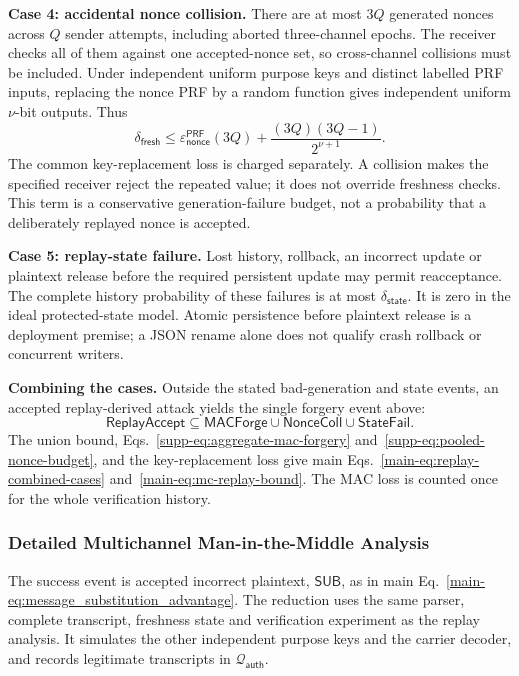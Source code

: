 \documentclass[journal]{IEEEtran}
\theoremstyle{definition}
\theoremstyle{game}
\begin{document}
\textbf{Case 4: accidental nonce collision.}
There are at most $3Q$ generated nonces across $Q$ sender attempts,
including aborted three-channel epochs.
The receiver checks all of them against one accepted-nonce set, so
cross-channel collisions must be included. Under independent uniform
purpose keys and distinct labelled PRF inputs, replacing the nonce PRF by
a random function gives independent uniform $\nu$-bit outputs. Thus
\begin{equation}\label{supp-eq:pooled-nonce-budget}
\delta_{\mathsf{fresh}}
\le\varepsilon_{\mathsf{nonce}}^{\mathsf{PRF}}(3Q)
+\frac{(3Q)(3Q-1)}{2^{\nu+1}}.
\end{equation}
The common key-replacement loss is charged separately. A collision makes
the specified receiver reject the repeated value; it does not override
freshness checks. This term is a conservative generation-failure budget,
not a probability that a deliberately replayed nonce is accepted.

\textbf{Case 5: replay-state failure.}
Lost history, rollback, an incorrect update or plaintext release before
the required persistent update may permit reacceptance. The complete
history probability of these failures is at most
$\delta_{\mathsf{state}}$. It is zero in the ideal protected-state model.
Atomic persistence before plaintext release is a deployment premise;
a JSON rename alone does not qualify crash rollback or concurrent writers.

\textbf{Combining the cases.}
Outside the stated bad-generation and state events, an accepted
replay-derived attack yields the single forgery event above:
\begin{equation}\label{supp-eq:replay-decomposition}
\mathsf{ReplayAccept}\subseteq\mathsf{MACForge}
\cup\mathsf{NonceColl}\cup\mathsf{StateFail}.
\end{equation}
The union bound, Eqs.~\eqref{supp-eq:aggregate-mac-forgery}
and~\eqref{supp-eq:pooled-nonce-budget}, and the key-replacement loss
give main Eqs.~\eqref{main-eq:replay-combined-cases}
and~\eqref{main-eq:mc-replay-bound}. The MAC loss is counted once for
the whole verification history.

\subsubsection{Detailed Multichannel Man-in-the-Middle Analysis}
\label{subsubsec:mc-mitm}
The success event is accepted incorrect plaintext, $\mathsf{SUB}$, as in
main Eq.~\eqref{main-eq:message_substitution_advantage}.
The reduction uses the same parser, complete transcript, freshness state
and verification experiment as the replay analysis. It simulates the
other independent purpose keys and the carrier decoder, and records
legitimate transcripts in $\mathcal Q_{\mathsf{auth}}$.
\end{document}
